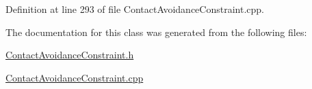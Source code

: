 Definition at line 293 of file Contact\+Avoidance\+Constraint.\+cpp.



The documentation for this class was generated from the following files\+:\begin{DoxyCompactItemize}
\item 
\hyperlink{ContactAvoidanceConstraint_8h}{Contact\+Avoidance\+Constraint.\+h}\item 
\hyperlink{ContactAvoidanceConstraint_8cpp}{Contact\+Avoidance\+Constraint.\+cpp}\end{DoxyCompactItemize}
